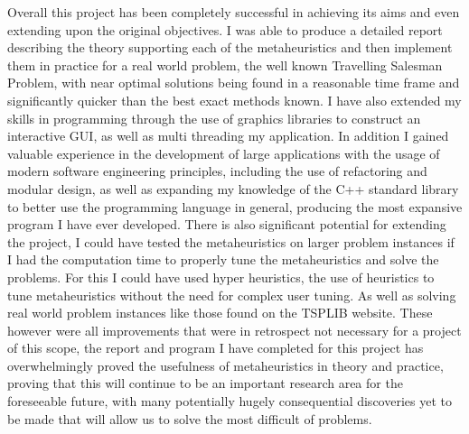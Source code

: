 \documentclass[]{final_report}
\begin{document}
Overall this project has been completely successful in achieving its aims and even extending upon the original objectives. I was able to produce a detailed report describing the theory supporting each of the metaheuristics and then implement them in practice for a real world problem, the well known Travelling Salesman Problem, with near optimal solutions being found in a reasonable time frame and significantly quicker than the best exact methods known. I have also extended my skills in programming through the use of graphics libraries to construct an interactive GUI, as well as multi threading my application. In addition I gained valuable experience in the development of large applications with the usage of modern software engineering principles, including the use of refactoring and modular design, as well as expanding my knowledge of the C++ standard library to better use the programming language in general, producing the most expansive program I have ever developed. There is also significant potential for extending the project, I could have tested the metaheuristics on larger problem instances if I had the computation time to properly tune the metaheuristics and solve the problems. For this I could have used hyper heuristics, the use of heuristics to tune metaheuristics without the need for complex user tuning. As well as solving real world problem instances like those found on the TSPLIB website. These however were all improvements that were in retrospect not necessary for a project of this scope, the report and program I have completed for this project has overwhelmingly proved the usefulness of metaheuristics in theory and practice, proving that this will continue to be an important research area for the foreseeable future, with many potentially hugely consequential discoveries yet to be made that will allow us to solve the most difficult of problems.
\end{document}
